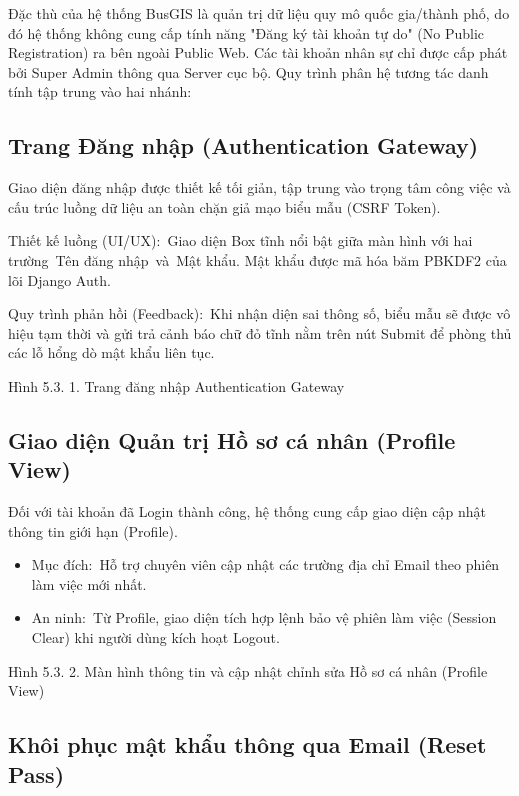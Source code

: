 \documentclass[13pt,a4paper]{report}
\begin{document}
Đặc thù của hệ thống BusGIS là quản trị dữ liệu quy mô quốc gia/thành phố, do đó hệ thống không cung cấp tính năng "Đăng ký tài khoản tự do" (No Public Registration) ra bên ngoài Public Web. Các tài khoản nhân sự chỉ được cấp phát bởi Super Admin thông qua Server cục bộ. Quy trình phân hệ tương tác danh tính tập trung vào hai nhánh:

\subsection{Trang Đăng nhập (Authentication Gateway)}

Giao diện đăng nhập được thiết kế tối giản, tập trung vào trọng tâm công việc và cấu trúc luồng dữ liệu an toàn chặn giả mạo biểu mẫu (CSRF Token).

Thiết kế luồng (UI/UX): Giao diện Box tĩnh nổi bật giữa màn hình với hai trường Tên đăng nhập và Mật khẩu. Mật khẩu được mã hóa băm PBKDF2 của lõi Django Auth.

Quy trình phản hồi (Feedback): Khi nhận diện sai thông số, biểu mẫu sẽ được vô hiệu tạm thời và gửi trả cảnh báo chữ đỏ tĩnh nằm trên nút Submit để phòng thủ các lỗ hổng dò mật khẩu liên tục.

Hình 5.3. 1. Trang đăng nhập Authentication Gateway

\subsection{Giao diện Quản trị Hồ sơ cá nhân (Profile View)}

Đối với tài khoản đã Login thành công, hệ thống cung cấp giao diện cập nhật thông tin giới hạn (Profile).

\begin{itemize}
    \item Mục đích: Hỗ trợ chuyên viên cập nhật các trường địa chỉ Email theo phiên làm việc mới nhất.
    \item An ninh: Từ Profile, giao diện tích hợp lệnh bảo vệ phiên làm việc (Session Clear) khi người dùng kích hoạt Logout.
\end{itemize}

Hình 5.3. 2. Màn hình thông tin và cập nhật chỉnh sửa Hồ sơ cá nhân (Profile View)

\subsection{Khôi phục mật khẩu thông qua Email (Reset Pass)}
\end{document}
